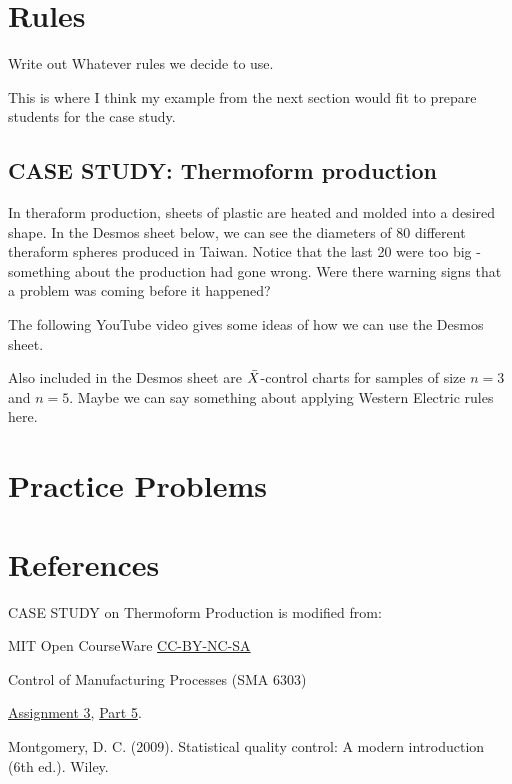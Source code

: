 \documentclass{ximera}
\begin{document}
\section*{Rules}
Write out Whatever rules we decide to use.  

This is where I think my example from the next section would fit to prepare students for the case study.

\subsection*{CASE STUDY: Thermoform production}

In theraform production, sheets of plastic are heated and molded into a desired shape.  In the Desmos sheet below, we can see the diameters of 80 different theraform spheres produced in Taiwan.  Notice that the last 20 were too big - something about the production had gone wrong.  Were there warning signs that a problem was coming before it happened?


The following YouTube video gives some ideas of how we can use the Desmos sheet.


Also included in the Desmos sheet are $\Bar{X}$-control charts for samples of size $n=3$ and $n=5$.  Maybe we can say something about applying Western Electric rules here.

\section*{Practice Problems}

\section*{References}

CASE STUDY on Thermoform Production is modified from:

MIT Open CourseWare \href{https://creativecommons.org/licenses/by-nc-sa/4.0/}{CC-BY-NC-SA}

Control of Manufacturing Processes (SMA 6303)

\href{https://ocw.mit.edu/courses/2-830j-control-of-manufacturing-processes-sma-6303-spring-2008/resources/ps3/}{Assignment 3}, \href{https://ocw.mit.edu/courses/2-830j-control-of-manufacturing-processes-sma-6303-spring-2008/resources/35/}{Part 5}. 

Montgomery, D. C. (2009). Statistical quality control: A modern introduction (6th ed.). Wiley.
\end{document}

